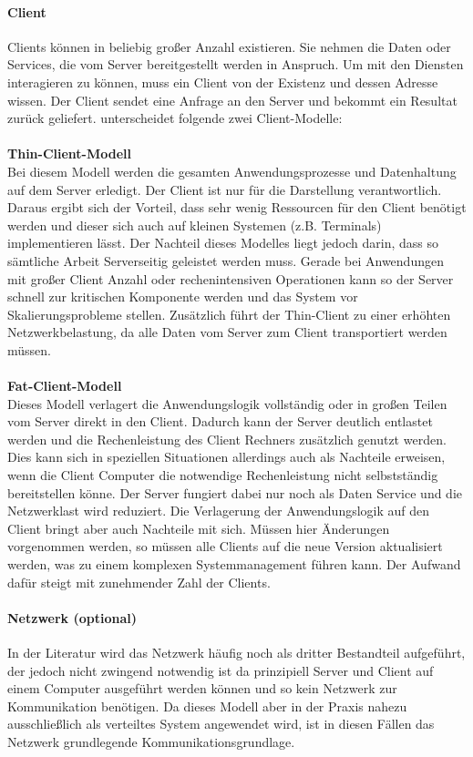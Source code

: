 	\paragraph{Client}
	Clients können in beliebig großer Anzahl existieren. Sie nehmen die Daten oder Services, die vom Server bereitgestellt werden in Anspruch. Um mit den Diensten interagieren zu können, muss ein Client von der Existenz und dessen Adresse wissen. Der Client sendet eine Anfrage an den Server und bekommt ein Resultat zurück geliefert. \citet*[S. 302]{Sommerville.2007} unterscheidet folgende zwei Client-Modelle:
	\\
	\\
	\textbf{Thin-Client-Modell}\\
	Bei diesem Modell werden die gesamten Anwendungsprozesse und Datenhaltung auf dem Server erledigt. Der Client ist nur für die Darstellung verantwortlich. Daraus ergibt sich der Vorteil, dass sehr wenig Ressourcen für den Client benötigt werden und dieser sich auch auf kleinen Systemen (z.B. Terminals) implementieren lässt. Der Nachteil dieses Modelles liegt jedoch darin, dass so sämtliche Arbeit Serverseitig geleistet werden muss. Gerade bei Anwendungen mit großer Client Anzahl oder rechenintensiven Operationen kann so der Server schnell zur kritischen Komponente werden und das System vor Skalierungsprobleme stellen. Zusätzlich führt der Thin-Client zu einer erhöhten Netzwerkbelastung, da alle Daten vom Server zum Client transportiert werden müssen.
	\\
	\\
\textbf{Fat-Client-Modell}\\
	Dieses Modell verlagert die Anwendungslogik vollständig oder in großen Teilen vom Server direkt in den Client. Dadurch kann der Server deutlich entlastet werden und die Rechenleistung des Client Rechners zusätzlich genutzt werden. Dies kann sich in speziellen Situationen allerdings auch als Nachteile erweisen, wenn die Client Computer die notwendige Rechenleistung nicht selbstständig bereitstellen könne. Der Server fungiert dabei nur noch als Daten Service und die Netzwerklast wird reduziert. Die Verlagerung der Anwendungslogik auf den Client bringt aber auch Nachteile mit sich. Müssen hier Änderungen vorgenommen werden, so müssen alle Clients auf die neue Version aktualisiert werden, was zu einem komplexen Systemmanagement führen kann. Der Aufwand dafür steigt mit zunehmender Zahl der Clients.
	
	\paragraph{Netzwerk (optional)}
	In der Literatur wird das Netzwerk häufig noch als dritter Bestandteil aufgeführt, der jedoch nicht zwingend notwendig ist da prinzipiell Server und Client auf einem Computer ausgeführt werden können und so kein Netzwerk zur Kommunikation benötigen. Da dieses Modell aber in der Praxis nahezu ausschließlich als verteiltes System angewendet wird, ist in diesen Fällen das Netzwerk grundlegende Kommunikationsgrundlage.
	
